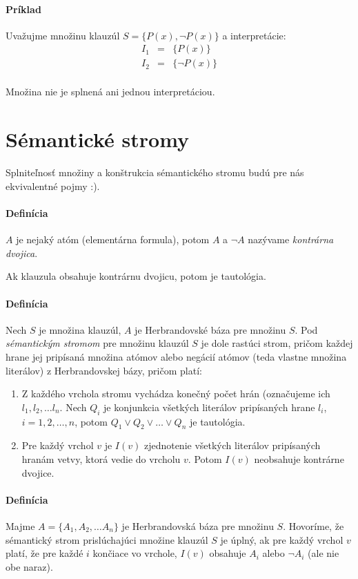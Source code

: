 \paragraph{Príklad} Uvažujme množinu klauzúl $S=\{P(x), \neg P(x)\}$ a
interpretácie:
$$
\begin{array}{lll}
I_1 &=& \{ P(x) \} \\
I_2 &=& \{ \neg P(x) \} \\
\end{array}
$$

Množina nie je splnená ani jednou interpretáciou.

\section{Sémantické stromy}
Splniteľnosť množiny a konštrukcia sémantického stromu budú pre nás ekvivalentné
pojmy :).

\paragraph{Definícia} $A$ je nejaký atóm (elementárna formula), potom $A$ a
$\neg A$ nazývame \emph{kontrárna dvojica}.

\par  Ak klauzula obsahuje kontrárnu dvojicu, potom je tautológia.

\paragraph{Definícia} Nech $S$ je množina klauzúl, $A$ je Herbrandovské báza pre
množinu $S$. Pod \emph{sémantickým stromom} pre množinu klauzúl $S$ je dole
rastúci strom, pričom každej hrane jej pripísaná množina atómov alebo negácií
atómov (teda vlastne množina literálov) z Herbrandovskej bázy, pričom platí:
\begin{enumerate}
	\item Z každého vrchola stromu vychádza konečný počet hrán (označujeme
	ich $l_1, l_2, \ldots l_n$. Nech $Q_i$ je konjunkcia všetkých literálov
	pripísaných hrane $l_i$, $i=1,2,\ldots,n$, potom $Q_1 \lor Q_2 \lor
	\ldots \lor Q_n$ je tautológia.
	\item Pre každý vrchol $v$ je $I(v)$ zjednotenie všetkých literálov
	pripísaných hranám vetvy, ktorá vedie do vrcholu $v$. Potom $I(v)$
	neobsahuje kontrárne dvojice.
\end{enumerate}


\paragraph{Definícia} Majme $A=\{ A_1, A_2, \ldots A_n \}$ je Herbrandovská báza
pre množinu $S$. Hovoríme, že sémantický strom prislúchajúci množine klauzúl $S$
je úplný, ak pre každý vrchol $v$ platí, že pre každé $i$ končiace vo vrchole,
$I(v)$ obsahuje $A_i$ alebo $\neg A_i$ (ale nie obe naraz).

